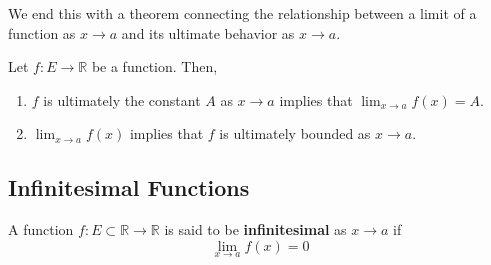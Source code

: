 \documentclass{article}
\begin{document}
    We end this with a theorem connecting the relationship between a limit of a function as $x \rightarrow a$ and its ultimate behavior as $x \rightarrow a$. 

    \begin{theorem}
    Let $f: E \longrightarrow \mathbb{R}$ be a function. Then, 
    \begin{enumerate}
      \item $f$ is ultimately the constant $A$ as $x \rightarrow a$ implies that $\lim_{x \rightarrow a} f(x) = A$. 
      \item $\lim_{x \rightarrow a} f(x)$ implies that $f$ is ultimately bounded as $x \rightarrow a$. 
    \end{enumerate}
    \end{theorem}

  \subsection{Infinitesimal Functions}

    \begin{definition}
      A function $f: E \subset \mathbb{R} \longrightarrow \mathbb{R}$ is said to be \textbf{infinitesimal} as $x \rightarrow a$ if 
      \[\lim_{x \rightarrow a} f(x) = 0\]
    \end{definition}
\end{document}
